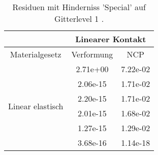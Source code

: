 \begin{table} 
\centering 
\begin{tabular}{c|cc|} 
\cline{2-3} 
 & \multicolumn{2}{|c|}{Linearer Kontakt} \\ 
\hline 
\multicolumn{1}{|c|}{Materialgesetz} & \multicolumn{1}{c|}{Verformung} & \multicolumn{1}{c|}{NCP} \\ 
\hline 
\multicolumn{1}{|c|}{\multirow{6}{*}{Linear elastisch}} &\multicolumn{1}{|c|}{  2.71e+00} & \multicolumn{1}{|c|}{  7.22e-02} \\ 
\multicolumn{1}{|c|}{} & \multicolumn{1}{|c|}{  2.06e-15} & \multicolumn{1}{|c|}{  1.71e-02} \\ 
\multicolumn{1}{|c|}{} & \multicolumn{1}{|c|}{  2.20e-15} & \multicolumn{1}{|c|}{  1.71e-02} \\ 
\multicolumn{1}{|c|}{} & \multicolumn{1}{|c|}{  2.01e-15} & \multicolumn{1}{|c|}{  1.68e-02} \\ 
\multicolumn{1}{|c|}{} & \multicolumn{1}{|c|}{  1.27e-15} & \multicolumn{1}{|c|}{  1.29e-02} \\ 
\multicolumn{1}{|c|}{} & \multicolumn{1}{|c|}{  3.68e-16} & \multicolumn{1}{|c|}{  1.14e-18} \\ 
\hline 
\end{tabular}\caption{Residuen mit Hinderniss 'Special' auf Gitterlevel 1 .}\label{tab:Residuum_Special_level1}
\end{table} 
